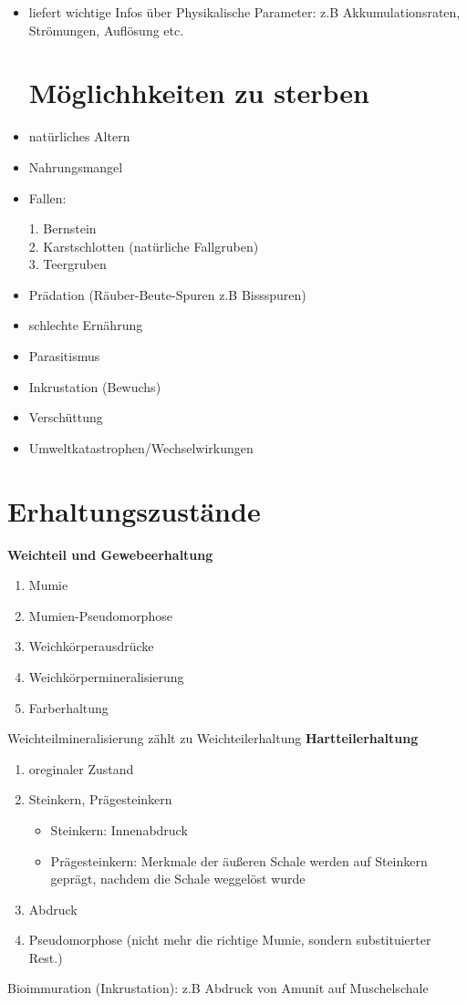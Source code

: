 \documentclass[a4paper,12pt]{scrartcl}
\begin{document}
\begin{itemize}
\item liefert wichtige Infos über Physikalische Parameter: z.B Akkumulationsraten, Strömungen, Auflösung etc.

\section{Möglichhkeiten zu sterben} \label{sec:Möglichkeiten zu sterben}

\item natürliches Altern
\item Nahrungsmangel
\item Fallen:

\begin{addmargin}[20mm]{0mm}
1. Bernstein \\
2. Karstschlotten (natürliche Fallgruben) \\
3. Teergruben
\end{addmargin}

\item Prädation (Räuber-Beute-Spuren z.B Bissspuren)
\item schlechte Ernährung
\item Parasitismus
\item Inkrustation (Bewuchs)
\item Verschüttung
\item Umweltkatastrophen/Wechselwirkungen
\end{itemize}



\section{Erhaltungszustände}

\textbf{Weichteil und Gewebeerhaltung}

\begin{enumerate}
\item Mumie
\item Mumien-Pseudomorphose
\item Weichkörperausdrücke
\item Weichkörpermineralisierung
\item Farberhaltung
\end{enumerate}
Weichteilmineralisierung zählt zu Weichteilerhaltung
\textbf{Hartteilerhaltung}

\begin{enumerate}
\item oreginaler Zustand
\item Steinkern, Prägesteinkern\\
\begin{itemize}
\item Steinkern: Innenabdruck 
\item Prägesteinkern: Merkmale der äußeren Schale werden auf Steinkern geprägt, nachdem die Schale weggelöst wurde
\end{itemize}
\item Abdruck
\item Pseudomorphose (nicht mehr die richtige Mumie, sondern substituierter Rest.)
\end{enumerate}
Bioimmuration (Inkrustation): z.B Abdruck von Amunit auf Muschelschale
\end{document}
